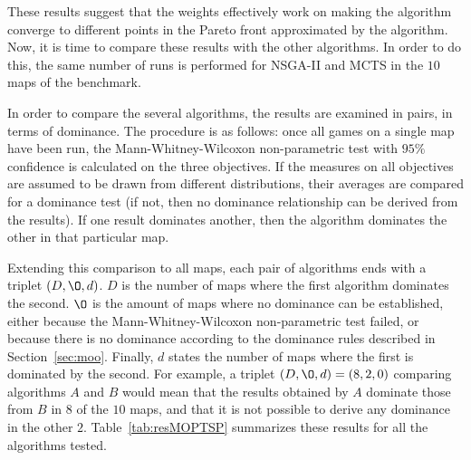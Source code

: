 \documentclass[journal]{IEEEtran}
\begin{document}
These results suggest that the weights effectively work on making the algorithm converge to different points in the Pareto front approximated by the algorithm. Now, it is time to compare these results with the other algorithms. In order to do this, the same number of runs is performed for NSGA-II and MCTS in the $10$ maps of the benchmark.

In order to compare the several algorithms, the results are examined in pairs, in terms of dominance. The procedure is as follows: once all games on a single map have been run, the Mann-Whitney-Wilcoxon non-parametric test with $95\%$ confidence is calculated on the three objectives. If the measures on all objectives are assumed to be drawn from different distributions, their averages are compared for a dominance test (if not, then no dominance relationship can be derived from the results). If one result dominates another, then the algorithm dominates the other in that particular map. 

Extending this comparison to all maps, each pair of algorithms ends with a triplet $(D, \O, d)$. $D$ is the number of maps where the first algorithm dominates the second. $\O$ is the amount of maps where no dominance can be established, either because the Mann-Whitney-Wilcoxon non-parametric test failed, or because there is no dominance according to the dominance rules described in Section~\ref{sec:moo}. Finally, $d$ states the number of maps where the first is dominated by the second. For example, a triplet $(D, \O, d) = (8,2,0)$ comparing algorithms $A$ and $B$ would mean that the results obtained by $A$ dominate those from $B$ in $8$ of the $10$ maps, and that it is not possible to derive any dominance in the other $2$. Table~\ref{tab:resMOPTSP} summarizes these results for all the algorithms tested.
\end{document}
